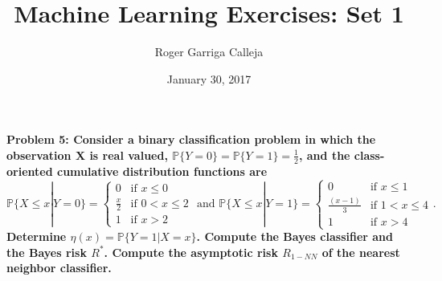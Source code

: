 \documentclass[11pt, english]{article}
\title{Machine Learning Exercises: Set 1}
\author{Roger Garriga Calleja}
\date{January 30, 2017}
\begin{document}
	\maketitle


\textbf{Problem 5: Consider a binary classification problem in which the observation X is real valued, $\mathbb{P}\{Y=0\}=\mathbb{P}\{Y=1\}=\frac{1}{2}$, and the class-oriented cumulative distribution functions are}
$$\mathbb{P}\{X\leq x|Y=0\}=\left\{\begin{array}{ll}
	0 & \text{if }x\leq 0\\
	\frac{x}{2} & \text{if } 0< x\leq 2\\
	1 & \text{if } x>2
\end{array}\right.\text{ and }\mathbb{P}\{X\leq x|Y=1\}=\left\{\begin{array}{ll}
	0 & \text{if } x\leq 1\\
	\frac{(x-1)}{3} & \text{if } 1< x\leq 4\\
	1 & \text{if } x>4
\end{array}\right..$$
\textbf{Determine $\eta(x)=\mathbb{P}\{Y=1|X=x\}$. Compute the Bayes classifier and the Bayes risk $R^*$. Compute the asymptotic risk $R_{1-NN}$ of the nearest neighbor classifier.\\}
\end{document}
